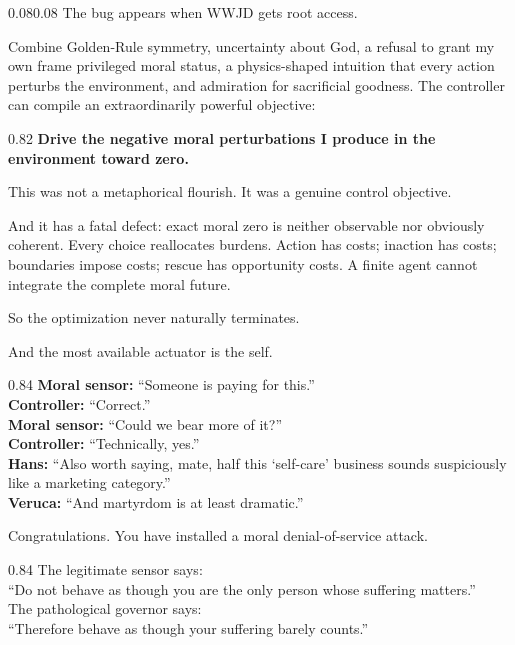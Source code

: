 \documentclass[10pt,letterpaper]{article}
\newenvironment{paperbody}
  {\begin{adjustwidth}{0.08\textwidth}{0.08\textwidth}\justifying}
  {\par\end{adjustwidth}}
\newenvironment{dialoguebox}
  {\Needspace{5\baselineskip}\par\vspace{0.26em}\begin{center}\begingroup
   \begin{lrbox}{\dialogueboxsave}\begin{varwidth}{0.84\linewidth}
   \small\rmfamily\upshape\RaggedRight}
  {\end{varwidth}\end{lrbox}\fbox{\usebox{\dialogueboxsave}}
   \endgroup\end{center}\vspace{0.26em}}
\newenvironment{thesisbox}
  {\Needspace{3.5\baselineskip}\par\vspace{0.32em}\begin{center}\begingroup
   \begin{lrbox}{\thesisboxsave}\begin{varwidth}{0.82\linewidth}
   \normalsize\rmfamily\bfseries\upshape\RaggedRight}
  {\end{varwidth}\end{lrbox}\fbox{\usebox{\thesisboxsave}}
   \endgroup\end{center}\vspace{0.32em}}
\begin{document}
\begin{paperbody}
The bug appears when WWJD gets root access.

Combine Golden-Rule symmetry, uncertainty about God, a refusal to grant
my own frame privileged moral status, a physics-shaped intuition that
every action perturbs the environment, and admiration for sacrificial
goodness. The controller can compile an extraordinarily powerful
objective:

\begin{thesisbox}
Drive the negative moral perturbations I produce in the
environment toward zero.
\end{thesisbox}

This was not a metaphorical flourish. It was a genuine control
objective.

And it has a fatal defect: exact moral zero is neither observable nor
obviously coherent. Every choice reallocates burdens. Action has costs;
inaction has costs; boundaries impose costs; rescue has opportunity
costs. A finite agent cannot integrate the complete moral future.

So the optimization never naturally terminates.

And the most available actuator is the self.

\begin{dialoguebox}
\textbf{Moral sensor:} ``Someone is paying for this.''\\[0.35em]
\textbf{Controller:} ``Correct.''\\[0.35em]
\textbf{Moral sensor:} ``Could we bear more of it?''\\[0.35em]
\textbf{Controller:} ``Technically, yes.''\\[0.35em]
\textbf{Hans:} ``Also worth saying, mate, half this `self-care' business
sounds suspiciously like a marketing category.''\\[0.35em]
\textbf{Veruca:} ``And martyrdom is at least dramatic.''
\end{dialoguebox}

Congratulations. You have installed a moral denial-of-service attack.

\begin{dialoguebox}
The legitimate sensor says:\\
``Do not behave as though you are the only person whose suffering
matters.''\\[0.35em]
The pathological governor says:\\
``Therefore behave as though your suffering barely counts.''
\end{dialoguebox}


\end{paperbody}
\end{document}
